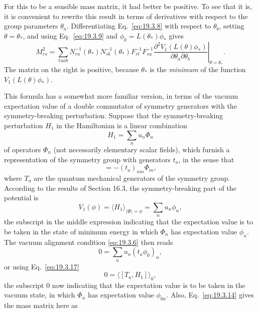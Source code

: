 For this to be a sensible mass matrix, it had better be positive. To see that it is, it is convenient to rewrite this result in terms of derivatives with respect to the group parameters $\theta_a$. Differentiating Eq.~\eqref{eq:19.3.8} with respect to $\theta_b$, setting $\theta=\theta_*$, and using Eq.~\eqref{eq:19.3.9} and $\phi_0=L(\theta_*)\phi_*$ gives
\begin{equation}
M_{rs}^2=\sum_{tuab}
N_{ra}^{-1}(\theta_*)N_{sb}^{-1}(\theta_*)
F_{rt}^{-1}F_{su}^{-1}
\left.
\frac{\partial^2 V_1(L(\theta)\phi_*)}
{\partial\theta_a\partial\theta_b}
\right|_{\theta=\theta_*}.
\tag{19.3.15}\label{eq:19.3.15}
\end{equation}
The matrix on the right is positive, because $\theta_*$ is the \emph{minimum} of the function $V_1(L(\theta)\phi_*)$.

This formula has a somewhat more familiar version, in terms of the vacuum expectation value of a double commutator of symmetry generators with the symmetry-breaking perturbation. Suppose that the symmetry-breaking perturbation $H_1$ in the Hamiltonian is a linear combination
\begin{equation}
H_1=\sum_n u_n\Phi_n
\tag{19.3.16}\label{eq:19.3.16}
\end{equation}
of operators $\Phi_n$ (not necessarily elementary scalar fields), which furnish a representation of the symmetry group with generators $t_a$, in the sense that
\begin{equation}
[T_a,\Phi_n]=-(t_a)_{nm}\Phi_m,
\tag{19.3.17}\label{eq:19.3.17}
\end{equation}
where $T_a$ are the quantum mechanical generators of the symmetry group. According to the results of Section 16.3, the symmetry-breaking part of the potential is
\begin{equation}
V_1(\phi)=\langle H_1\rangle_{\langle\Phi\rangle=\phi}
=\sum_n u_n\phi_n,
\tag{19.3.18}\label{eq:19.3.18}
\end{equation}
the subscript in the middle expression indicating that the expectation value is to be taken in the state of minimum energy in which $\Phi_n$ has expectation value $\phi_n$. The vacuum alignment condition \eqref{eq:19.3.6} then reads
\[
0=\sum_n u_n(t_a\phi_0)_n,
\]
or using Eq.~\eqref{eq:19.3.17}
\begin{equation}
0=\langle[T_a,H_1]\rangle_0,
\tag{19.3.19}\label{eq:19.3.19}
\end{equation}
the subscript $0$ now indicating that the expectation value is to be taken in the vacuum state, in which $\Phi_n$ has expectation value $\phi_{0n}$. Also, Eq.~\eqref{eq:19.3.14} gives the mass matrix here as
